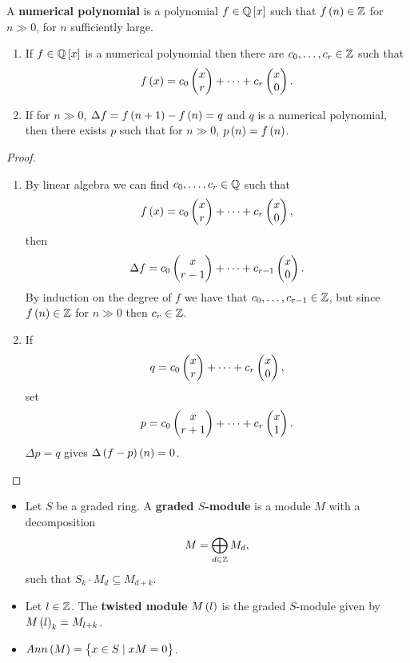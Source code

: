 \begin{definition}
A \textbf{numerical polynomial} is a polynomial $ f \in \Q\sbr{x} $ such that $ f\br{n} \in \Z $ for $ n \gg 0 $, for $ n $ sufficiently large.
\end{definition}

\begin{theorem}
\hfill
\begin{enumerate}
\item If $ f \in \Q\sbr{x} $ is a numerical polynomial then there are $ c_0, \dots, c_r \in \mathbb{Z} $ such that
$$ f\br{x} = c_0\twobyone{x}{r} + \dots + c_r\twobyone{x}{0}. $$
\item If for $ n \gg 0 $, $ \Delta f = f\br{n + 1} - f\br{n} = q $ and $ q $ is a numerical polynomial, then there exists $ p $ such that for $ n \gg 0 $, $ p\br{n} = f\br{n} $.
\end{enumerate}
\end{theorem}

\begin{proof}
\hfill
\begin{enumerate}
\item By linear algebra we can find $ c_0, \dots, c_r \in \mathbb{Q} $ such that
$$ f\br{x} = c_0\twobyone{x}{r} + \dots + c_r\twobyone{x}{0}, $$
then
$$ \Delta f = c_0\begin{pmatrix} x \\ r - 1 \end{pmatrix} + \dots + c_{r - 1}\begin{pmatrix} x \\ 0 \end{pmatrix}. $$
By induction on the degree of $ f $ we have that $ c_0, \dots, c_{r - 1} \in \mathbb{Z} $, but since $ f\br{n} \in \Z $ for $ n \gg 0 $ then $ c_r \in \mathbb{Z} $.
\item If
$$ q = c_0\begin{pmatrix} x \\ r \end{pmatrix} + \dots + c_r\begin{pmatrix} x \\ 0 \end{pmatrix}, $$
set
$$ p = c_0\begin{pmatrix} x \\ r + 1 \end{pmatrix} + \dots + c_r\begin{pmatrix} x \\ 1 \end{pmatrix}. $$
$ \Delta p = q $ gives $ \Delta \br{f - p}\br{n} = 0 $.
\end{enumerate}
\end{proof}

\pagebreak

\begin{definition}
\hfill
\begin{itemize}
\item Let $ S $ be a graded ring. A \textbf{graded $ S $-module} is a module $ M $ with a decomposition
$$ M = \bigoplus_{d \in \mathbb{Z}} M_d, $$
such that $ S_k \cdot M_d \subseteq M_{d + k} $.
\item Let $ l \in \mathbb{Z} $. The \textbf{twisted module} $ M\br{l} $ is the graded $ S $-module given by $ M\br{l}_k = M_{l + k} $.
\item $ Ann\br{M} = \cbr{x \in S \mid xM = 0} $.
\end{itemize}
\end{definition}

